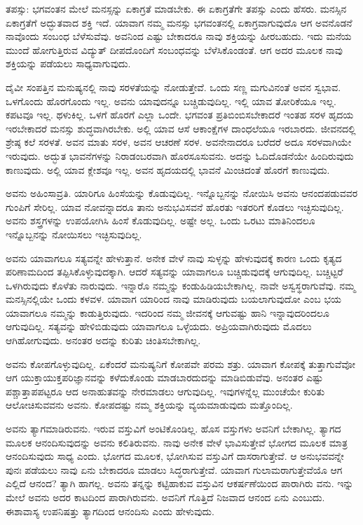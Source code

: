 ತಪಸ್ಸು: ಭಗವಂತನ ಮೇಲೆ ಮನಸ್ಸನ್ನು ಏಕಾಗ್ರತೆ ಮಾಡಬೇಕು. ಈ ಏಕಾಗ್ರತೆಗೇ ತಪಸ್ಸು ಎಂದು ಹೆಸರು. ಮನಸ್ಸಿನ ಏಕಾಗ್ರತೆಗೆ ಅದ್ಭುತವಾದ ಶಕ್ತಿ ಇದೆ. ಯಾವಾಗ ನಮ್ಮ ಮನಸ್ಸು ಭಗವಂತನಲ್ಲಿ ಏಕಾಗ್ರವಾಗುವುದೊ ಆಗ ಅವನೊಡನೆ ನಾವೊಂದು ಸಂಬಂಧ ಬೆಳೆಸುವೆವು. ಅವನಿಂದ ಎಷ್ಟು ಬೇಕಾದರೂ ನಾವು ಶಕ್ತಿಯನ್ನು ಹೀರಬಹುದು. ಇದು ಮನೆಯ ಮುಂದೆ ಹೋಗುತ್ತಿರುವ ವಿದ್ಯುತ್ ದೀಪದೊಂದಿಗೆ ಸಂಬಂಧವನ್ನು ಬೆಳೆಸಿಕೊಂಡಂತೆ. ಆಗ ಅದರ ಮೂಲಕ ನಾವು ಶಕ್ತಿಯನ್ನು ಪಡೆಯಲು ಸಾಧ್ಯವಾಗುವುದು.

ದೈವೀ ಸಂಪತ್ತಿನ ಮನುಷ್ಯನಲ್ಲಿ ನಾವು ಸರಳತೆಯನ್ನು ನೋಡುತ್ತೇವೆ. ಒಂದು ಸಣ್ಣ ಮಗುವಿನಂತೆ ಅವನ ಸ್ವಭಾವ. ಒಳಗೊಂದು ಹೊರಗೊಂದು ಇಲ್ಲ. ಅವನು ಯಾವುದನ್ನೂ ಬಚ್ಚಿಡುವುದಿಲ್ಲ. ಇಲ್ಲಿ ಯಾವ ತೋರಿಕೆಯೂ ಇಲ್ಲ. ಕಪಟವೂ ಇಲ್ಲ. ಥಳುಕಿಲ್ಲ. ಒಳಗೆ ಹೊರಗೆ ಎಲ್ಲಾ ಒಂದೇ. ಭಗವಂತ ಪ್ರತಿಬಿಂಬಿಸಬೇಕಾದರೆ ಇಂತಹ ಸರಳ ಹೃದಯ ಇರಬೇಕಾದರೆ ಮನಸ್ಸು ಶುದ್ಧವಾಗಿರಬೇಕು. ಅಲ್ಲಿ ಯಾವ ಆಸೆ ಆಕಾಂಕ್ಷೆಗಳ ದಾಂಧಲೆಯೂ ಇರಬಾರದು. ಜೀವನದಲ್ಲಿ ಶ್ರೇಷ್ಠ ಕಲೆ ಸರಳತೆ. ಅವನ ಮಾತು ಸರಳ, ಅವನ ಆಚರಣೆ ಸರಳ. ಅವನೇನಾದರೂ ಬರೆದರೆ ಅದೂ ಸರಳವಾಗಿಯೇ ಇರುವುದು. ಅದ್ಭುತ ಭಾವನೆಗಳನ್ನು ನಿರಾಡಂಬರವಾಗಿ ಹೊರಸೂಸುವನು. ಅದನ್ನು ಓದಿದೊಡನೆಯೇ ಹಿಂದಿರುವುದು ಕಾಣುವುದು. ಅಲ್ಲಿ ಯಾವ ಕ್ಲೇಶವೂ ಇಲ್ಲ. ಅವನ ಹೃದಯದಲ್ಲಿ ಭಾವನೆ ಮಿಂಚಿದಂತೆ ಹೊರಗೆ ಕಾಣುವುದು.

ಅವನು ಅಹಿಂಸಾವ್ರತಿ. ಯಾರಿಗೂ ಹಿಂಸೆಯನ್ನು ಕೊಡುವುದಿಲ್ಲ. ಇನ್ನೊಬ್ಬನನ್ನು ನೋಯಿಸಿ ಅವನು ಆನಂದಪಡುವವರ ಗುಂಪಿಗೆ ಸೇರಿಲ್ಲ. ಯಾವ ನೋವನ್ನಾದರೂ ತಾನು ಅನುಭವಿಸವನೆ ಹೊರತು ಇತರರಿಗೆ ಕೊಡಲು ಇಚ್ಛಿಸುವುದಿಲ್ಲ. ಅವನು ಶಸ್ತ್ರಗಳನ್ನು ಉಪಯೋಗಿಸಿ ಹಿಂಸೆ ಕೊಡುವುದಿಲ್ಲ. ಅಷ್ಟೇ ಅಲ್ಲ. ಒಂದು ಒರಟು ಮಾತಿನಿಂದಲೂ ಇನ್ನೊಬ್ಬನನ್ನು ನೋಯಿಸಲು ಇಚ್ಛಿಸುವುದಿಲ್ಲ.

ಅವನು ಯಾವಾಗಲೂ ಸತ್ಯವನ್ನೇ ಹೇಳುತ್ತಾನೆ. ಅನೇಕ ವೇಳೆ ನಾವು ಸುಳ್ಳನ್ನು ಹೇಳುವುದಕ್ಕೆ ಕಾರಣ ಒಂದು ಕೃತ್ಯದ ಪರಿಣಾಮದಿಂದ ತಪ್ಪಿಸಿಕೊಳ್ಳುವುದಕ್ಕಾಗಿ. ಆದರೆ ಸತ್ಯವನ್ನು ಯಾವಾಗಲೂ ಬಚ್ಚಿಡುವುದಕ್ಕೆ ಆಗುವುದಿಲ್ಲ. ಬಚ್ಚಿಟ್ಟರೆ ಒಳಗಿರುವುದು ಕೊಳೆತು ನಾರುವುದು. ಇನ್ನಾರೊ ನಮ್ಮನ್ನು ಕಂಡುಹಿಡಿಯಬೇಕಾಗಿಲ್ಲ. ನಾವೇ ಅಸ್ವಸ್ಥರಾಗುವೆವು. ನಮ್ಮ ಮನಸ್ಸಿನಲ್ಲಿಯೇ ಒಂದು ಕಳವಳ. ಯಾವಾಗ ಯಾರಿಂದ ನಾವು ಮಾಡಿರುವುದು ಬಯಲಾಗುವುದೋ ಎಂಬ ಭಯ ಯಾವಾಗಲೂ ನಮ್ಮನ್ನು ಕಾಡುತ್ತಿರುವುದು. ಇದರಿಂದ ನಮ್ಮ ಜೀವನಕ್ಕೆ ಆಗುವಷ್ಟು ಹಾನಿ ಇನ್ನಾವುದರಿಂದಲೂ ಆಗುವುದಿಲ್ಲ. ಸತ್ಯವನ್ನು ಹೇಳಿಬಿಡುವುದು ಯಾವಾಗಲೂ ಒಳ್ಳೆಯದು. ಅಪ್ರಿಯವಾಗಿರುವುದು ಮೊದಲು ಆಗಿಹೋಗುವುದು. ಅನಂತರ ಅದನ್ನು ಕುರಿತು ಚಿಂತಿಸಬೇಕಾಗಿಲ್ಲ.

ಅವನು ಕೋಪಗೊಳ್ಳುವುದಿಲ್ಲ. ಏಕೆಂದರೆ ಮನುಷ್ಯನಿಗೆ ಕೋಪವೇ ಪರಮ ಶತ್ರು. ಯಾವಾಗ ಕೋಪಕ್ಕೆ ತುತ್ತಾಗುವೆವೋ ಆಗ ಯುಕ್ತಾಯುಕ್ತಪರಿಜ್ಞಾನವನ್ನು ಕಳೆದುಕೊಂಡು ಮಾಡಬಾರದುದನ್ನು ಮಾಡಿಬಿಡುವೆವು. ಅನಂತರ ಎಷ್ಟು ಪಶ್ಚಾತ್ತಾಪಪಟ್ಟರೂ ಆದ ಅನಾಹುತವನ್ನು ನೇರಮಾಡಲು ಆಗುವುದಿಲ್ಲ. ಇವುಗಳನ್ನೆಲ್ಲ ಮುಂಚೆಯೇ ಕುರಿತು ಆಲೋಚಿಸುವವನು ಅವನು. ಕೋಪದಷ್ಟು ನಮ್ಮ ಶಕ್ತಿಯನ್ನು ವ್ಯಯಮಾಡುವುದು ಮತ್ತೊಂದಿಲ್ಲ.

ಅವನು ತ್ಯಾಗಮಾಡಿರುವನು. ಇರುವ ವಸ್ತುವಿಗೆ ಅಂಟಿಕೊಂಡಿಲ್ಲ. ಹೊಸ ವಸ್ತುಗಳು ಅವನಿಗೆ ಬೇಕಾಗಿಲ್ಲ. ತ್ಯಾಗದ ಮೂಲಕ ಆನಂದಿಸುವುದನ್ನು ಅವನು ಕಲಿತಿರುವನು. ನಾವು ಅನೇಕ ವೇಳೆ ಭಾವಿಸುತ್ತೇವೆ ಭೋಗದ ಮೂಲಕ ಮಾತ್ರ ಆನಂದಿಸುವುದು ಸಾಧ್ಯ ಎಂದು. ಭೋಗದ ಮೂಲಕ, ಭೋಗಿಸುವ ವಸ್ತುವಿಗೆ ದಾಸರಾಗುತ್ತೇವೆ. ಆ ಅನುಭವವನ್ನೇ ಪುನಃ ಪಡೆಯಲು ನಾವು ಏನು ಬೇಕಾದರೂ ಮಾಡಲು ಸಿದ್ಧರಾಗುತ್ತೇವೆ. ಯಾವಾಗ ಗುಲಾಮರಾಗುತ್ತೇವೆಯೊ ಆಗ ಎಲ್ಲಿದೆ ಆನಂದ? ತ್ಯಾಗಿ ಹಾಗಲ್ಲ. ಅವನು ತನ್ನನ್ನು ಕಟ್ಟಿಹಾಕುವ ವಸ್ತುವಿನ ಆಕರ್ಷಣೆಯಿಂದ ಪಾರಾಗಿರು ವನು. ಇನ್ನು ಮೇಲೆ ಅವನು ಅದರ ಕಾಟದಿಂದ ಪಾರಾಗಿರುವನು. ಅವನಿಗೆ ಗೊತ್ತಿದೆ ನಿಜವಾದ ಆನಂದ ಏನು ಎಂಬುದು. ಈಶಾವಾಸ್ಯ ಉಪನಿಷತ್ತು ತ್ಯಾಗದಿಂದ ಆನಂದಿಸು ಎಂದು ಹೇಳುವುದು.

